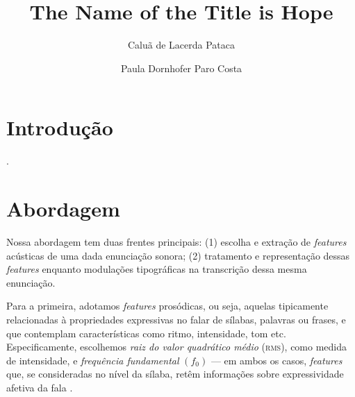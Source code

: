 \documentclass[11pt]{article}
\title{The Name of the Title is Hope}
\author{Caluã de Lacerda Pataca \and Paula Dornhofer Paro Costa}
\begin{document}
\hyphenation{}
\pagestyle{fancy}


  \section{Introdu\c{c}\~{a}o}
  \label{sec:introducao}

   .

  \section{Abordagem}
  \label{sec:abordagem}
  
  Nossa abordagem tem duas frentes principais: (1) escolha e extração de {\itshape features} acústicas de uma dada enunciação sonora; (2) tratamento e representação dessas {\itshape features} enquanto modulações tipográficas na transcrição dessa mesma enunciação.
  
  Para a primeira, adotamos {\itshape features} prosódicas, ou seja, aquelas tipicamente relacionadas à propriedades expressivas no falar de sílabas, palavras ou frases, e que contemplam características como ritmo, intensidade, tom etc. Especificamente, escolhemos {\itshape raiz do valor quadrático médio} \textsc{(rms)}, como medida de intensidade, e {\itshape frequência fundamental} $(f_0)$ --- em ambos os casos, {\itshape features} que, se consideradas no nível da sílaba, retêm informações sobre expressividade afetiva da fala \cite{rao2010characterization}.
  
\end{document}
